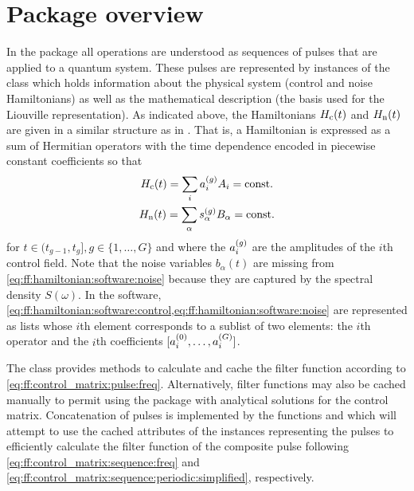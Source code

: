 \section{Package overview}\label{sec:ff:software:overview}
In the \filterfunctions package all operations are understood as sequences of pulses that are applied to a quantum system.
These pulses are represented by instances of the \pulsesequence class which holds information about the physical system (control and noise Hamiltonians) as well as the mathematical description (\eg the basis used for the Liouville representation).
As indicated above, the Hamiltonians $H_{\mathrm{c}}(t)$ and $H_{\mathrm{n}}(t)$ are given in a similar structure as in \qutip.
That is, a Hamiltonian is expressed as a sum of Hermitian operators with the time dependence encoded in piecewise constant coefficients so that
\begin{subequations}\label{eq:ff:hamiltonian:software}
\begin{gather}
    H_{\mathrm{c}}(t) = \sum_i a^{(g)}_i A_i = \mathrm{const.} \label{eq:ff:hamiltonian:software:control} \\
    H_{\mathrm{n}}(t) = \sum_\alpha s^{(g)}_\alpha B_\alpha = \mathrm{const.} \label{eq:ff:hamiltonian:software:noise}
\end{gather}
\end{subequations}
for $t\in (t_{g-1}, t_g], g\in\lbrace 1,\dotsc,G\rbrace$ and where the $a^{(g)}_i$ are the amplitudes of the $i$th control field.
Note that the noise variables $b_\alpha(t)$ are missing from \cref{eq:ff:hamiltonian:software:noise} because they are captured by the spectral density $S(\omega)$.
In the software, \cref{eq:ff:hamiltonian:software:control,eq:ff:hamiltonian:software:noise} are represented as lists whose $i$th element corresponds to a sublist of two elements: the $i$th operator and the $i$th coefficients $[a_i^{(0)},\dotsc,a_i^{(G)}]$.

The \pulsesequence class provides methods to calculate and cache the filter function according to \cref{eq:ff:control_matrix:pulse:freq}.
Alternatively, filter functions may also be cached manually to permit using the package with analytical solutions for the control matrix.
Concatenation of pulses is implemented by the functions  and  which will attempt to use the cached attributes of the \pulsesequence instances representing the pulses to efficiently calculate the filter function of the composite pulse following \cref{eq:ff:control_matrix:sequence:freq} and \cref{eq:ff:control_matrix:sequence:periodic:simplified}, respectively.

